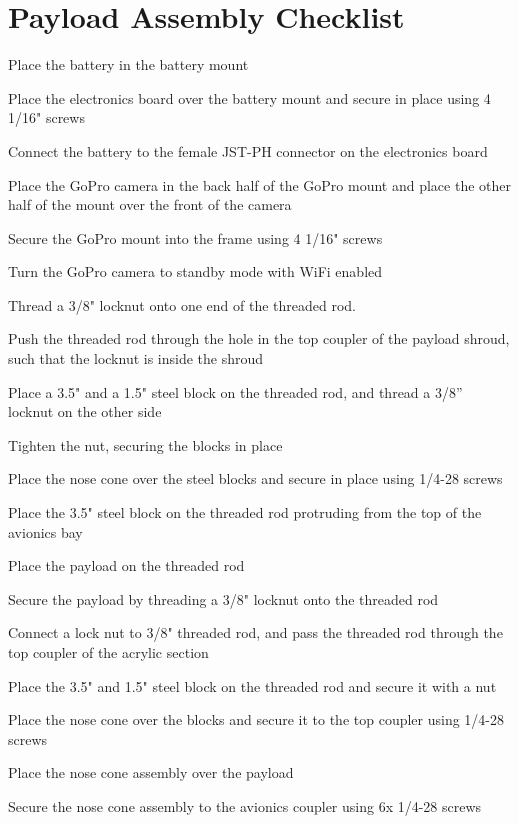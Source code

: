 \section{Payload Assembly Checklist}
    \begin{checklist}
        \item Place the battery in the battery mount
        \item Place the electronics board over the battery mount and secure in place using 4 1/16" screws
        \item Connect the battery to the female JST-PH connector on the electronics board
        \item Place the GoPro camera in the back half of the GoPro mount and place the other half of the mount over the front of the camera
        \item Secure the GoPro mount into the frame using 4 1/16" screws
        \item Turn the GoPro camera to standby mode with WiFi enabled
        \item Thread a 3/8" locknut onto one end of the threaded rod.
        \item Push the threaded rod through the hole in the top coupler of the payload shroud, such that the locknut is inside the shroud
        \item Place a 3.5" and a 1.5" steel block on the threaded rod, and thread a 3/8” locknut on the other side
        \item Tighten the nut, securing the blocks in place
        \item Place the nose cone over the steel blocks and secure in place using 1/4-28 screws
        \item Place the 3.5" steel block on the threaded rod protruding from the top of the avionics bay
        \item Place the payload on the threaded rod
        \item Secure the payload by threading a 3/8"  locknut onto the threaded rod
        \item Connect a lock nut to 3/8" threaded rod, and pass the threaded rod through the top coupler of the acrylic section
        \item Place the 3.5" and 1.5" steel block on the threaded rod and secure it with a nut
        \item Place the nose cone over the blocks and secure it to the top coupler using 1/4-28 screws
        \item Place the nose cone assembly over the payload
        \item Secure the nose cone assembly to the avionics coupler using 6x 1/4-28 screws
    \end{checklist}

